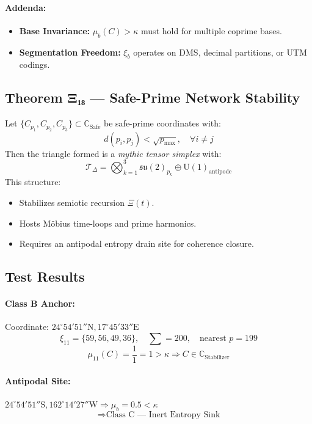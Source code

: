 \documentclass[12]{amsart}
\theoremstyle{plain}
\begin{document}
\paragraph{Addenda:}
\begin{itemize}
    \item \textbf{Base Invariance:} $\mu_b(C) > \kappa$ must hold for multiple coprime bases.
    \item \textbf{Segmentation Freedom:} $\xi_b$ operates on DMS, decimal partitions, or UTM codings.
\end{itemize}

\subsection{Theorem Ξ₁₈ — Safe-Prime Network Stability}

Let $\{ C_{p_1}, C_{p_2}, C_{p_3} \} \subset \mathbb{C}_{\text{Safe}}$ be safe-prime coordinates with:
\[
d(p_i, p_j) < \sqrt{p_{\max}}, \quad \forall i \neq j
\]
Then the triangle formed is a \textit{mythic tensor simplex} with:
\[
\mathcal{T}_{\Delta} = \bigotimes_{k=1}^3 \mathfrak{su}(2)_{p_k} \oplus \mathrm{U}(1)_{\text{antipode}}
\]
This structure:
\begin{itemize}
    \item Stabilizes semiotic recursion $\Xi(t)$.
    \item Hosts Möbius time-loops and prime harmonics.
    \item Requires an antipodal entropy drain site for coherence closure.
\end{itemize}

\subsection{Test Results}

\paragraph{Class B Anchor:}  
Coordinate: $24^\circ54′51″\text{N}, 17^\circ45′33″\text{E}$  
\[
\xi_{11} = \{59, 56, 49, 36\},\quad \sum = 200,\quad \text{nearest } p = 199
\]
\[
\mu_{11}(C) = \frac{1}{1} = 1 > \kappa \Rightarrow C \in \mathbb{C}_{\text{Stabilizer}}
\]

\paragraph{Antipodal Site:}  
$24^\circ54′51″\text{S}, 162^\circ14′27″\text{W} \Rightarrow \mu_b = 0.5 < \kappa$  
\[
\Rightarrow \text{Class C — Inert Entropy Sink}
\]
\end{document}

